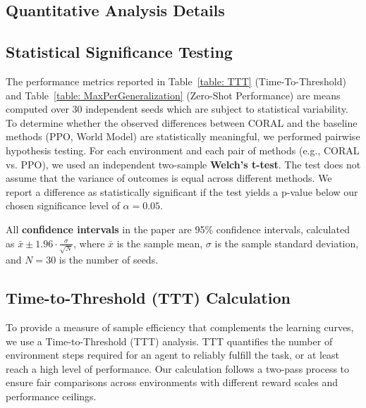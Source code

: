 \documentclass[letterpaper]{article} %
\begin{document}
\begin{appendix}
\section{Quantitative Analysis Details}
\subsection{Statistical Significance Testing}
\label{subsec:welch_t_test}
The performance metrics reported in Table~\ref{table: TTT} (Time-To-Threshold) and Table~\ref{table: MaxPerGeneralization} (Zero-Shot Performance) are means computed over 30 independent seeds which are subject to statistical variability. To determine whether the observed differences between CORAL and the baseline methods (PPO, World Model) are statistically meaningful, we performed pairwise hypothesis testing. For each environment and each pair of methods (e.g., CORAL vs. PPO), we used an independent two-sample \textbf{Welch's t-test}. The test does not assume that the variance of outcomes is equal across different methods. We report a difference as statistically significant if the test yields a p-value below our chosen significance level of $\alpha=0.05$. 

All \textbf{confidence intervals} in the paper are 95\% confidence intervals, calculated as $\bar{x} \pm 1.96 \cdot \frac{\sigma}{\sqrt{N}}$, where $\bar{x}$ is the sample mean, $\sigma$ is the sample standard deviation, and $N=30$ is the number of seeds.

\subsection{Time-to-Threshold (TTT) Calculation}

To provide a measure of sample efficiency that complements the learning curves, we use a Time-to-Threshold (TTT) analysis. TTT quantifies the number of environment steps required for an agent to reliably fulfill the task, or at least reach a high level of performance. Our calculation follows a two-pass process to ensure fair comparisons across environments with different reward scales and performance ceilings.


\end{appendix}
\end{document}
